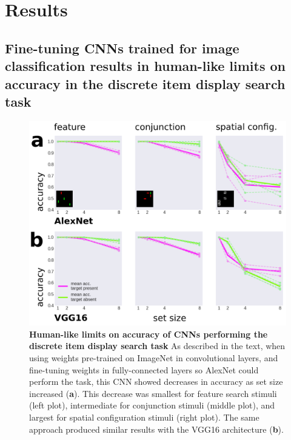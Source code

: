 \documentclass[10pt,letterpaper]{article}
\begin{document}
\section{Results}

\subsection{Fine-tuning CNNs trained for image classification results in human-like limits on accuracy in the discrete item display search task}

\begin{figure}[!ht]
\begin{center}
\includegraphics[width=\columnwidth]{fig2/fig2.png}
\end{center}
\caption{
\textbf{Human-like limits on accuracy of CNNs performing the discrete item display search task}
As described in the text, when using weights pre-trained on ImageNet in convolutional layers, 
and fine-tuning weights in fully-connected layers so AlexNet could perform the task, 
this CNN showed decreases in accuracy as set size increased (\textbf{a}). This decrease was 
smallest for feature search stimuli (left plot), intermediate for conjunction stimuli (middle plot), 
and largest for spatial configuration stimuli (right plot). The same approach produced similar 
results with the VGG16 architecture (\textbf{b}).
} 
\label{fig2}
\end{figure}
\end{document}
